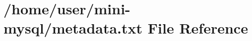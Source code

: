 \hypertarget{metadata_8txt}{}\section{/home/user/mini-\/mysql/metadata.txt File Reference}
\label{metadata_8txt}
